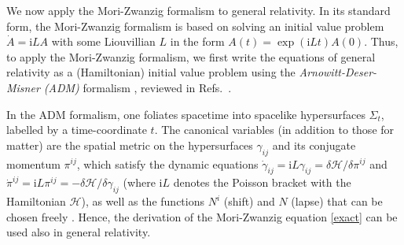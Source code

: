 \documentclass[aps,prl,twocolumn,10pt,superscriptaddress,nofootinbib,balancelastpage]{revtex4-1}
\newcommand{\ii}{\mathrm{i}}%
\begin{document}
We now apply the Mori-Zwanzig formalism to general relativity. In its standard form, the Mori-Zwanzig formalism is based on solving an initial value problem $\dot{A}= \ii L A$ with some Liouvillian $L$ in the form $A(t)=\exp(\ii L t)A(0)$. Thus, to apply the Mori-Zwanzig formalism, we first write the equations of general relativity as a (Hamiltonian) initial value problem using the \textit{Arnowitt-Deser-Misner (ADM) }formalism \cite{ArnowittDM1959,Arnowitt1DM960,ArnowittDM1960b}, reviewed in Refs.\ \cite{SchaeferJ2018,Lehner2001}. 

In the {ADM} formalism, one foliates spacetime into spacelike hypersurfaces $\Sigma_t$, labelled by a time-coordinate $t$. The canonical variables (in addition to those for matter) are the spatial metric on the hypersurfaces $\gamma_{ij}$ and its conjugate momentum $\pi^{ij}$, which satisfy the dynamic equations $\dot{\gamma}_{ij} =\ii L \gamma_{ij}=\delta \mathcal{H}/\delta \pi^{ij}$ and $\dot{\pi}^{ij}=\ii L \pi^{ij}=-\delta \mathcal{H}/\delta \gamma_{ij}$ (where $\ii L$ denotes the Poisson bracket with the Hamiltonian $\mathcal{H}$), as well as the functions $N^i$ (shift) and $N$ (lapse) that can be chosen freely \cite{Gourgoulhon2007}. Hence, the derivation of the Mori-Zwanzig equation \eqref{exact} can be used also in general relativity. 
\end{document}
